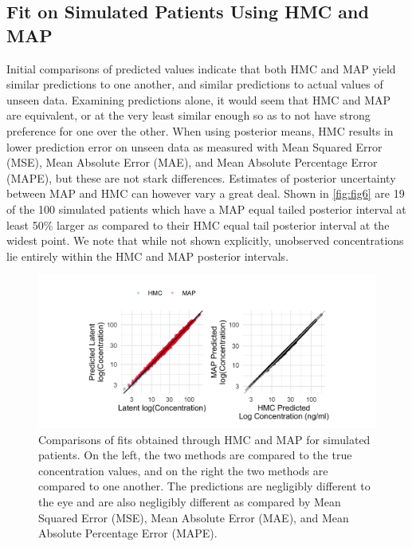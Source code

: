 \subsection*{Fit on Simulated Patients Using HMC and MAP}

Initial comparisons of predicted values indicate that both HMC and MAP yield similar predictions to one another, and similar predictions to actual values of unseen data.  Examining predictions alone, it would seem that HMC and MAP are equivalent, or at the very least similar enough so as to not have strong preference for one over the other. When using posterior means, HMC results in lower prediction error on unseen data as measured with Mean Squared Error (MSE), Mean Absolute Error (MAE), and Mean Absolute Percentage Error (MAPE), but these are not stark differences. Estimates of posterior uncertainty between MAP and HMC can however vary a great deal. Shown in \cref{fig:fig6} are 19 of the 100 simulated patients which have a MAP equal tailed posterior interval at least 50\% larger as compared to their HMC equal tail posterior interval at the widest point. We note that while not shown explicitly, unobserved concentrations lie entirely within the HMC and MAP posterior intervals.

\begin{figure}
	\centering
	\includegraphics[width=1\linewidth]{figs/compare}
	\caption{Comparisons of fits obtained through HMC and MAP for simulated patients.  On the left, the two methods are compared to the true concentration values, and on the right the two methods are compared to one another.  The predictions are negligibly different to the eye and are also negligibly different as compared by Mean Squared Error (MSE), Mean Absolute Error (MAE), and Mean Absolute Percentage Error (MAPE).}
	\label{fig:fig5}
\end{figure}


